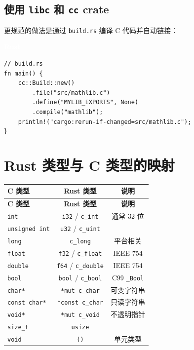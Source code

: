 \documentclass[12pt,a4paper,fontset=fandol]{ctexbook}
\newcommand{\rustlabel}{%
  \begin{tcolorbox}[enhanced,colback=rustheadbg,colframe=rustheadbg,
    arc=1mm,boxrule=0mm,left=6pt,right=6pt,top=2pt,bottom=2pt,
    halign=left,oversize]
    \textcolor{white}{\small\bfseries Rust}
  \end{tcolorbox}\vspace{-4pt}}
\begin{document}
\subsection{使用 \texttt{libc} 和 \texttt{cc} crate}

更规范的做法是通过 \texttt{build.rs} 编译 C 代码并自动链接：

\rustlabel
\begin{lstlisting}[style=ruststyle]
// build.rs
fn main() {
    cc::Build::new()
        .file("src/mathlib.c")
        .define("MYLIB_EXPORTS", None)
        .compile("mathlib");
    println!("cargo:rerun-if-changed=src/mathlib.c");
}
\end{lstlisting}

\section{Rust 类型与 C 类型的映射}

\begin{longtable}{lcc}
\toprule
\textbf{C 类型} & \textbf{Rust 类型} & \textbf{说明} \\
\midrule
\endfirsthead
\toprule
\textbf{C 类型} & \textbf{Rust 类型} & \textbf{说明} \\
\midrule
\endhead
\texttt{int}           & \texttt{i32} / \texttt{c\_int}     & 通常 32 位 \\
\texttt{unsigned int}  & \texttt{u32} / \texttt{c\_uint}    & \\
\texttt{long}          & \texttt{c\_long}                   & 平台相关 \\
\texttt{float}         & \texttt{f32} / \texttt{c\_float}   & IEEE 754 \\
\texttt{double}        & \texttt{f64} / \texttt{c\_double}  & IEEE 754 \\
\texttt{bool}          & \texttt{bool} / \texttt{c\_bool}   & C99 \texttt{\_Bool} \\
\texttt{char*}         & \texttt{*mut c\_char}              & 可变字符串 \\
\texttt{const char*}   & \texttt{*const c\_char}            & 只读字符串 \\
\texttt{void*}         & \texttt{*mut c\_void}              & 不透明指针 \\
\texttt{size\_t}       & \texttt{usize}                     & \\
\texttt{void}          & \texttt{()}                        & 单元类型 \\
\bottomrule
\end{longtable}
\end{document}
